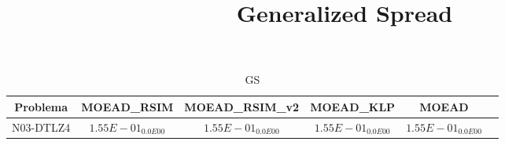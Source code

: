 \documentclass{article}
\title{Generalized Spread}
\author{}
\begin{document}
\maketitle
\begin{table*}[ht!]
\scriptsize
\caption{GS}
\centering\begin{tabular}{|c||c||c||c||c||c|} \hline
Problema &MOEAD_RSIM &MOEAD_RSIM_v2 &MOEAD_KLP &MOEAD\\\hline
N03-DTLZ4 &\cellcolor{gray95}$1.55E-01_{0.0E00}$ &\cellcolor{gray25}$1.55E-01_{0.0E00}$ &$1.55E-01_{0.0E00}$ &$1.55E-01_{0.0E00}$\\ 
\hline
\end{tabular}
\end{table*}
\end{document}
